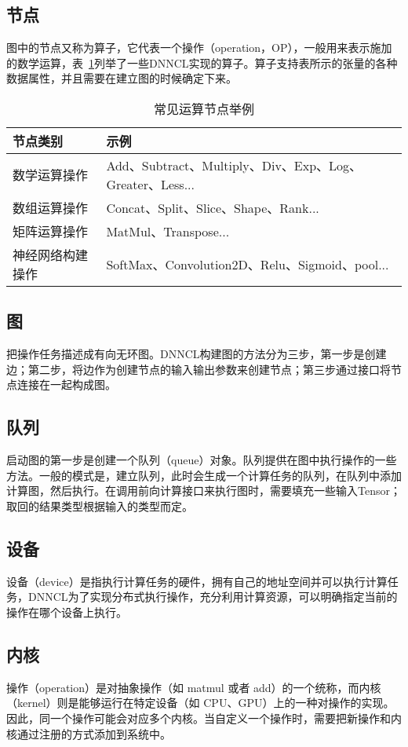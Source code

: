 \subsection {节点}
图中的节点又称为算子，它代表一个操作（operation，OP），一般用来表示施加的数学运算，表~\ref{tab:compute-node}列举了一些DNNCL实现的算子。算子支持表所示的张量的各种数据属性，并且需要在建立图的时候确定下来。

\begin{table}[htb]
  \centering\small
  \caption{常见运算节点举例}
  \label{tab:compute-node}
  \begin{tabular}{ll}
    \toprule
    节点类别   &  示例                                     \\
    \midrule
    数学运算操作 & Add、Subtract、Multiply、Div、Exp、Log、Greater、Less... \\
    数组运算操作 & Concat、Split、Slice、Shape、Rank... \\
    矩阵运算操作 & MatMul、Transpose...     \\
    神经网络构建操作 & SoftMax、Convolution2D、Relu、Sigmoid、pool... \\
    \bottomrule
  \end{tabular}
\end{table}

\subsection {图}
把操作任务描述成有向无环图。DNNCL构建图的方法分为三步，第一步是创建边；第二步，将边作为创建节点的输入输出参数来创建节点；第三步通过接口将节点连接在一起构成图。

\subsection {队列}
启动图的第一步是创建一个队列（queue）对象。队列提供在图中执行操作的一些方法。一般的模式是，建立队列，此时会生成一个计算任务的队列，在队列中添加计算图，然后执行。在调用前向计算接口来执行图时，需要填充一些输入Tensor；取回的结果类型根据输入的类型而定。

\subsection {设备}
设备（device）是指执行计算任务的硬件，拥有自己的地址空间并可以执行计算任务，DNNCL为了实现分布式执行操作，充分利用计算资源，可以明确指定当前的操作在哪个设备上执行。

\subsection {内核}
操作（operation）是对抽象操作（如 matmul 或者 add）的一个统称，而内核（kernel）则是能够运行在特定设备（如 CPU、GPU）上的一种对操作的实现。因此，同一个操作可能会对应多个内核\cite{dongmian}。当自定义一个操作时，需要把新操作和内核通过注册的方式添加到系统中。

